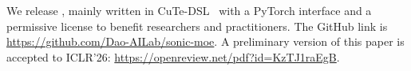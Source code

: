 \begin{itemize}


\end{itemize}




We release \Algname, mainly written in CuTe-DSL~\citep{cutedsl} with a PyTorch interface and a permissive license to benefit researchers and practitioners. The GitHub link is {\small \url{https://github.com/Dao-AILab/sonic-moe}}. A preliminary version of this paper is accepted to ICLR'26: {\small \url{https://openreview.net/pdf?id=KzTJ1raEgB}}.















